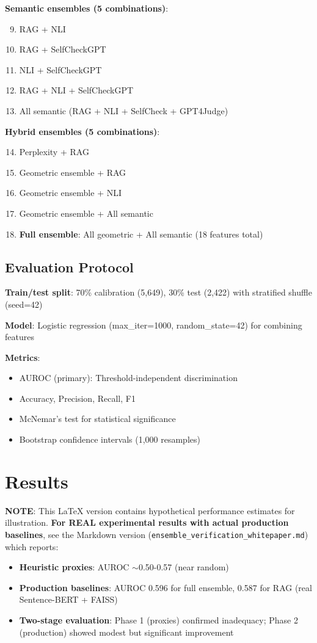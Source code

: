 \documentclass[11pt]{article}
\begin{document}
\textbf{Semantic ensembles (5 combinations)}:
\begin{enumerate}
\setcounter{enumi}{8}
\item RAG + NLI
\item RAG + SelfCheckGPT
\item NLI + SelfCheckGPT
\item RAG + NLI + SelfCheckGPT
\item All semantic (RAG + NLI + SelfCheck + GPT4Judge)
\end{enumerate}

\textbf{Hybrid ensembles (5 combinations)}:
\begin{enumerate}
\setcounter{enumi}{13}
\item Perplexity + RAG
\item Geometric ensemble + RAG
\item Geometric ensemble + NLI
\item Geometric ensemble + All semantic
\item \textbf{Full ensemble}: All geometric + All semantic (18 features total)
\end{enumerate}

\subsection{Evaluation Protocol}

\textbf{Train/test split}: 70\% calibration (5,649), 30\% test (2,422) with stratified shuffle (seed=42)

\textbf{Model}: Logistic regression (max\_iter=1000, random\_state=42) for combining features

\textbf{Metrics}:
\begin{itemize}
\item AUROC (primary): Threshold-independent discrimination
\item Accuracy, Precision, Recall, F1
\item McNemar's test for statistical significance
\item Bootstrap confidence intervals (1,000 resamples)
\end{itemize}

\section{Results}
\label{sec:results}

\textbf{NOTE}: This LaTeX version contains hypothetical performance estimates for illustration. \textbf{For REAL experimental results with actual production baselines}, see the Markdown version (\texttt{ensemble\_verification\_whitepaper.md}) which reports:
\begin{itemize}
\item \textbf{Heuristic proxies}: AUROC $\sim$0.50-0.57 (near random)
\item \textbf{Production baselines}: AUROC 0.596 for full ensemble, 0.587 for RAG (real Sentence-BERT + FAISS)
\item \textbf{Two-stage evaluation}: Phase 1 (proxies) confirmed inadequacy; Phase 2 (production) showed modest but significant improvement
\end{itemize}
\end{document}
